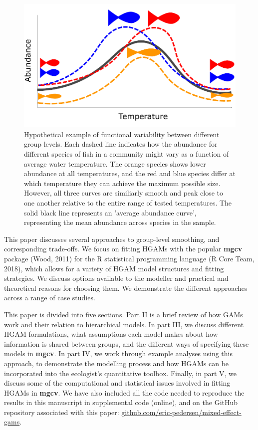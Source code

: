 \documentclass[12pt]{article}
\begin{document}
\begin{figure}

{\centering \includegraphics[width=.6\linewidth]{../figures/Fig1} 

}

\caption{\label{fig:Fig1}Hypothetical example of functional variability between different group levels. Each dashed line indicates how the abundance for different species of fish in a community might vary as a function of average water temperature. The orange species shows lower abundance at all temperatures, and the red and blue species differ at which temperature they can achieve the maximum possible size. However, all three curves are similiarly smooth and peak close to one another relative to the entire range of tested temperatures. The solid black line represents an 'average abundance curve', representing the mean abundance across species in the sample.}\label{fig:Fig1}
\end{figure}

This paper discusses several approaches to group-level smoothing, and
corresponding trade-offs. We focus on fitting HGAMs with the popular
\textbf{mgcv} package (Wood, 2011) for the R statistical programming
language (R Core Team, 2018), which allows for a variety of HGAM model
structures and fitting strategies. We discuss options available to the
modeller and practical and theoretical reasons for choosing them. We
demonstrate the different approaches across a range of case studies.

This paper is divided into five sections. Part II is a brief review of
how GAMs work and their relation to hierarchical models. In part III, we
discuss different HGAM formulations, what assumptions each model makes
about how information is shared between groups, and the different ways
of specifying these models in \textbf{mgcv}. In part IV, we work through
example analyses using this approach, to demonstrate the modelling
process and how HGAMs can be incorporated into the ecologist's
quantitative toolbox. Finally, in part V, we discuss some of the
computational and statistical issues involved in fitting HGAMs in
\textbf{mgcv}. We have also included all the code needed to reproduce
the results in this manuscript in supplemental code (online), and on the
GitHub repository associated with this paper:
\href{http://www.github.com/eric-pedersen/mixed-effect-gams}{github.com/eric-pedersen/mixed-effect-gams}.
\end{document}
